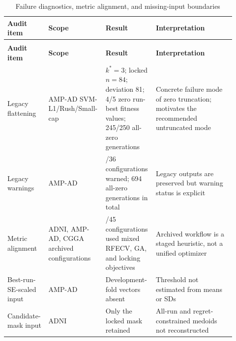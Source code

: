 {
\footnotesize
\renewcommand{\arraystretch}{1.10}
\setlength{\tabcolsep}{3pt}
\begin{longtable}{@{}>{\raggedright\arraybackslash}p{0.16\linewidth}>{\raggedright\arraybackslash}p{0.21\linewidth}>{\raggedright\arraybackslash}p{0.21\linewidth}>{\raggedright\arraybackslash}p{0.34\linewidth}@{}}
\caption{Failure diagnostics, metric alignment, and missing-input boundaries}\label{tab:main3}\\
\toprule
\bfseries Audit item & \bfseries Scope & \bfseries Result & \bfseries Interpretation \\
\midrule
\endfirsthead
\multicolumn{4}{l}{\footnotesize\itshape Table 3 (continued)}\\
\toprule
\bfseries Audit item & \bfseries Scope & \bfseries Result & \bfseries Interpretation \\
\midrule
\endhead
\bottomrule
\endfoot
Legacy flattening & AMP-AD SVM-L1/Rush/Small-cap & $k^*=3$; locked $n=84$; deviation 81; 4/5 zero run-best fitness values; 245/250 all-zero generations & Concrete failure mode of zero truncation; motivates the recommended untruncated mode \\
Legacy warnings & AMP-AD & 18/36 configurations warned; 694 all-zero generations in total & Legacy outputs are preserved but warning status is explicit \\
Metric alignment & ADNI, AMP-AD, CGGA archived configurations & 45/45 configurations used mixed RFECV, GA, and locking objectives & Archived workflow is a staged heuristic, not a unified optimizer \\
Best-run-SE-scaled input & AMP-AD & Development-fold vectors absent & Threshold not estimated from means or SDs \\
Candidate-mask input & ADNI & Only the locked mask retained & All-run and regret-constrained medoids not reconstructed \\
\end{longtable}
}
